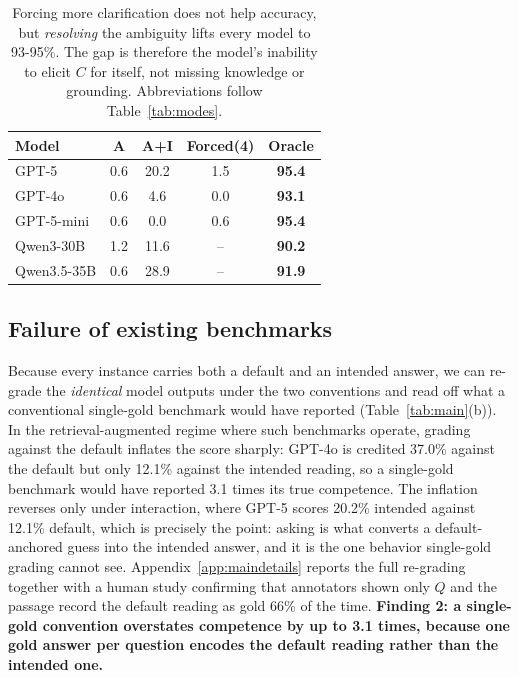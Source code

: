 \begin{table}[t]
\centering
\caption{Forcing more clarification does not help accuracy, but \emph{resolving} the ambiguity lifts every model to 93-95\%. The gap is therefore the model's inability to elicit $C$ for itself, not missing knowledge or grounding. Abbreviations follow Table~\ref{tab:modes}.}
\label{tab:ceiling}
\small
\begin{tabular}{lcccc}
\toprule
Model & A & A+I & Forced(4) & \textbf{Oracle} \\
\midrule
GPT-5      & 0.6 & 20.2 & 1.5 & \textbf{95.4} \\
GPT-4o     & 0.6 & 4.6  & 0.0 & \textbf{93.1} \\
GPT-5-mini & 0.6 & 0.0  & 0.6 & \textbf{95.4} \\
Qwen3-30B   & 1.2 & 11.6 & -- & \textbf{90.2} \\
Qwen3.5-35B & 0.6 & 28.9 & -- & \textbf{91.9} \\
\bottomrule
\end{tabular}
\end{table}



\subsection{Failure of existing benchmarks}
\label{sec:illusion}

Because every instance carries both a default and an intended answer, we can re-grade the \emph{identical} model outputs under the two conventions and read off what a conventional single-gold benchmark would have reported (Table~\ref{tab:main}(b)). In the retrieval-augmented regime where such benchmarks operate, grading against the default inflates the score sharply: GPT-4o is credited 37.0\% against the default but only 12.1\% against the intended reading, so a single-gold benchmark would have reported 3.1 times its true competence. The inflation reverses only under interaction, where GPT-5 scores 20.2\% intended against 12.1\% default, which is precisely the point: asking is what converts a default-anchored guess into the intended answer, and it is the one behavior single-gold grading cannot see. Appendix~\ref{app:maindetails} reports the full re-grading together with a human study confirming that annotators shown only $Q$ and the passage record the default reading as gold 66\% of the time. \textbf{Finding 2: a single-gold convention overstates competence by up to 3.1 times, because one gold answer per question encodes the default reading rather than the intended one.}



